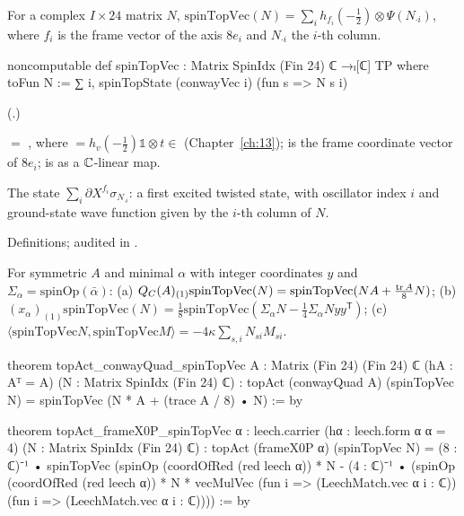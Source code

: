 \begin{definition}\label{ch21:def:spinTopVec}
For a complex $I\times24$ matrix $N$, $\mathrm{spinTopVec}(N)=\sum_ih_{f_i}(-\tfrac12)\otimes\Psi(N_{\cdot i})$,
where $f_i$ is the frame vector of the axis $8e_i$ and $N_{\cdot i}$ the $i$-th column.
\end{definition}
\begin{leancode}
noncomputable def spinTopVec : Matrix SpinIdx (Fin 24) ℂ →ₗ[ℂ] TP where
  toFun N := ∑ i, spinTopState (conwayVec i) (fun s => N s i)
\end{leancode}
(.)
\begin{dictionary}
 $=$ , where  $=h_v(-\tfrac12)\mathbb1\otimes t\in$
 (Chapter~\ref{ch:13});  is
the frame coordinate vector of $8e_i$;  is  as a ${\mathbb{C}}$-linear map.
\end{dictionary}
\begin{physics}
The state $\sum_i\partial X^{f_i}\sigma_{N_{\cdot i}}$: a first excited twisted state, with oscillator
index $i$ and ground-state wave function given by the $i$-th column of $N$.
\end{physics}
\begin{status}
Definitions; audited in .
\end{status}
\begin{theorem}\label{ch21:thm:twistedTop}
For symmetric $A$ and minimal $\alpha$ with integer coordinates $y$ and $\Sigma_\alpha=\mathrm{spinOp}(\bar\alpha)$:
(a) $Q_C(A)_{(1)}\mathrm{spinTopVec}(N)=\mathrm{spinTopVec}(NA+\tfrac{\operatorname{tr} A}8N)$;
(b) $(x_\alpha)_{(1)}\mathrm{spinTopVec}(N)=\tfrac18\mathrm{spinTopVec}(\Sigma_\alpha N-\tfrac14\Sigma_\alpha Nyy^{\mathsf T})$;
(c) $\langle\mathrm{spinTopVec}N,\mathrm{spinTopVec}M\rangle=-4\kappa\sum_{s,i}N_{si}M_{si}$.
\end{theorem}
\begin{leancode}
theorem topAct_conwayQuad_spinTopVec {A : Matrix (Fin 24) (Fin 24) ℂ} (hA : Aᵀ = A)
    (N : Matrix SpinIdx (Fin 24) ℂ) :
    topAct (conwayQuad A) (spinTopVec N) = spinTopVec (N * A + (trace A / 8) • N) := by
\end{leancode}
\begin{leancode}
theorem topAct_frameX0P_spinTopVec {α : leech.carrier} (hα : leech.form α α = 4)
    (N : Matrix SpinIdx (Fin 24) ℂ) :
    topAct (frameX0P α) (spinTopVec N)
      = (8 : ℂ)⁻¹ • spinTopVec (spinOp (coordOfRed (red leech α)) * N
          - (4 : ℂ)⁻¹ • (spinOp (coordOfRed (red leech α)) * N
              * vecMulVec (fun i => (LeechMatch.vec α i : ℂ)) (fun i => (LeechMatch.vec α i : ℂ)))) := by
\end{leancode}
